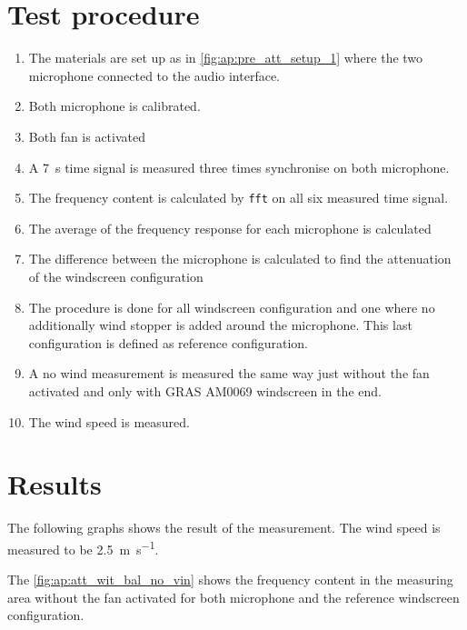 \section*{Test procedure}


\begin{enumerate}
\item The materials are set up as in \autoref{fig:ap:pre_att_setup_1} where the two microphone connected to the audio interface.
\item Both microphone is calibrated.
\item Both fan is activated 
\item A \SI{7}{\second} time signal is measured three times synchronise on both microphone.
\item The frequency content is calculated by \texttt{fft} on all six measured time signal.
\item The average of the frequency response for each microphone is calculated
\item The difference between the microphone is calculated to find the attenuation of the windscreen configuration
\item The procedure is done for all windscreen configuration and one where no additionally wind stopper is added around the microphone. This last configuration is defined as reference configuration.
\item A no wind measurement is measured the same way just without the fan activated and only with GRAS AM0069 windscreen in the end.
\item The wind speed is measured.
\end{enumerate}

\section*{Results}

The following graphs shows the result of the measurement. The wind speed is measured to be \SI{2.5}{\meter\per\second}. 


The \autoref{fig:ap:att_wit_bal_no_vin} shows the frequency content in the measuring area without the fan activated for both microphone and the reference windscreen configuration.



